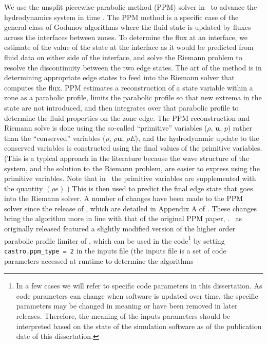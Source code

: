 \documentclass[12pt]{article}
\begin{document}
We use the unsplit piecewise-parabolic method (PPM) solver in \castro\
to advance the hydrodynamics system in time \citep{ppmunsplit}. The PPM method
is a specific case of the general class of Godunov algorithms \citep{godunov:1959}
where the fluid state is updated by fluxes across the interfaces between zones.
To determine the flux at an interface, we estimate of the value of the state at
the interface as it would be predicted from fluid data on either side of the interface,
and solve the Riemann problem to resolve the discontinuity between the two edge
states. The art of the method is in determining appropriate edge states to feed into
the Riemann solver that computes the flux. PPM estimates a reconstruction of a
state variable within a zone as a parabolic profile, limits the parabolic profile so that new extrema
in the state are not introduced, and then integrates over that parabolic profile to determine the
fluid properties on the zone edge. The PPM reconstruction and Riemann solve
is done using the so-called ``primitive'' variables ($\rho$, $\mathbf{u}$, $p$) rather
than the ``conserved'' variables ($\rho$, $\rho \mathbf{u}$, $\rho E$), and the
hydrodynamic update to the conserved variables is constructed using the final values of the primitive
variables. (This is a typical approach in the literature because the wave structure
of the system, and the solution to the Riemann problem, are easier to express using
the primitive variables. Note that in \castro\ the primitive variables are supplemented
with the quantity $(\rho e)$.) This is then used to predict the final edge state
that goes into the Riemann solver. A number of changes have been made to the
PPM solver since the release of \castro, which are detailed in Appendix A of
\cite{wdmergerI}. These changes bring the algorithm more in line with that of
the original PPM paper, \cite{ppm}. \castro\ as originally released featured a slightly modified
version of the higher order parabolic profile limiter of \cite{colella-sekora:2008},
which can be used in the code\footnote{In a few cases we will refer to
specific code parameters in this dissertation. As code parameters can change
when software is updated over time, the specific parameters may be changed
in meaning or have been removed in later releases. Therefore, the meaning
of the inputs parameters should be interpreted based on the state of the
simulation software as of the publication date of this dissertation.} by
setting \texttt{castro.ppm\_type = 2} in the inputs file (the inputs file is
a set of code parameters accessed at runtime to determine the algorithms
\end{document}
